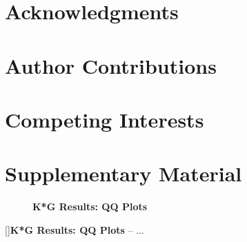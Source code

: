 \documentclass[12pt, a4paper]{article}
\begin{document}
\section{Acknowledgments}\label{InterPath-Acknowledgments}

\section{Author Contributions}\label{InterPath-Author-Contributions}

\section{Competing Interests}\label{InterPath-Competing-Interests}

\begingroup

%
\endgroup

\clearpage
\section{Supplementary Material}

\captionsetup[figure]{name=Supplementary Figure}
\captionsetup[table]{name=Supplementary Table}


\begingroup

%
\endgroup


\iffalse

\begin{figure}[htbp]
\centering
{}
\caption[K*G Results: QQ Plots]{\textbf{K*G Results: QQ Plots}}
\label{InterPath-Main-KG-QQPlots-Orig}
\end{figure} 
\begingroup
\renewcommand{\thefigure}{\arabic{figure} (Cont.)}
\addtocounter{figure}{-1}
[]{\textbf{K*G Results: QQ Plots} -- ...}
\renewcommand{\thefigure}{\arabic{figure}}
\endgroup
\end{document}
